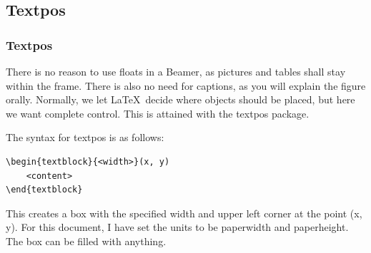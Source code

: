 \documentclass[UKenglish, unknownkeysallowed]{beamer}
\begin{document}
\subsection{Textpos}


\begin{frame}[fragile]
    \frametitle{Textpos}

    There is no reason to use floats in a Beamer,
    as pictures and tables shall stay within the frame.
    There is also no need for captions,
    as you will explain the figure orally.
    Normally, we let \LaTeX\ decide where objects should be placed,
    but here we want complete control.
    This is attained with the \alert{textpos} package.

    \medskip

    The syntax for textpos is as follows:

\begin{lstlisting}[language = {[LaTeX]{TeX}}]
\begin{textblock}{<width>}(x, y)
    <content>
\end{textblock}
\end{lstlisting}

    This creates a box with the specified width and upper left corner at the point (x, y).
    For this document, I have set the units to be paperwidth and paperheight.
    The box can be filled with anything.
\end{frame}
\end{document}

